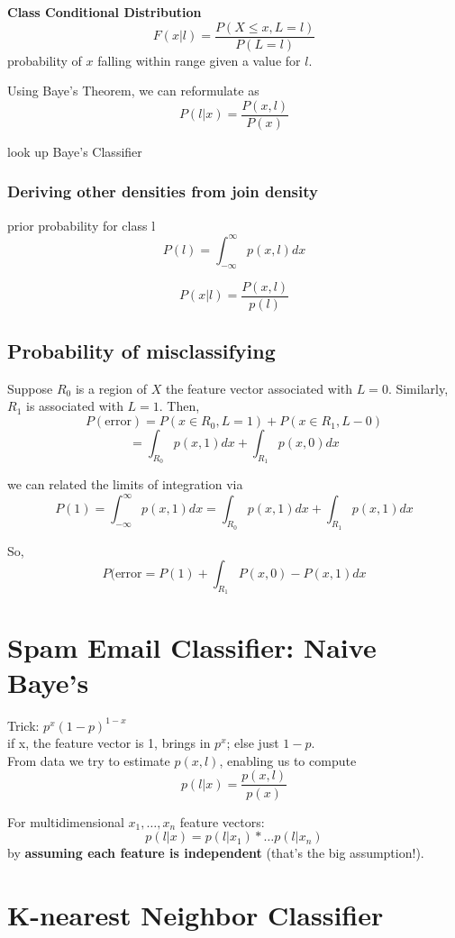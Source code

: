 \documentclass[12pt]{article}
\newcommand{\bt}[1]{\textbf{#1}} %
\begin{document}
\textbf{Class Conditional Distribution}\\
$$F(x | l) = \frac{P(X \leq x, L = l)}{P(L = l)}$$
probability of $x$ falling within range given a value for $l$.

Using Baye's Theorem, we can reformulate as
$$P(l | x) = \frac{P(x, l)}{P(x)}$$

look up Baye's Classifier

\subsubsection*{Deriving other densities from join density}
prior probability for class l
$$P(l) = \int_{-\infty}^\infty p(x, l) dx$$

$$P(x | l) = \frac{ P(x, l)}{p(l)}$$

\subsection*{Probability of misclassifying}

Suppose $R_0$ is a region of $X$ the feature vector associated with $L =0$. 
Similarly, $R_1$ is associated with $L=1$.
Then, 
$$P(\text{error}) = P(x \in R_0, L=1) + P(x \in R_1, L-0) $$
$$= \int_{R_0} p(x, 1) dx + \int_{R_1} p(x, 0) dx$$

we can related the limits of integration via 
$$P(1) = \int_{-\infty}^\infty p(x, 1) dx = \int_{R_0} p(x, 1) dx + \int_{R_1} p(x, 1) dx$$

So, 
$$P(\text{error} = P(1) + \int_{R_1} P(x, 0) - P(x, 1) dx$$




\section*{Spam Email Classifier: Naive Baye's}

Trick: $p^x ( 1 - p)^{1-x} $\\
if x, the feature vector is 1, brings in $p^x$; else just $1-p$.\\


From data we try to estimate $p(x, l)$, enabling us to compute
$$p(l | x) = \frac{p(x, l)}{p(x)}$$


For multidimensional $x_1, \dots, x_n$ feature vectors: 
$$p(l | x) = p(l | x_1) * \dots p(l | x_n)$$
by \bt{assuming each feature is independent} (that's the big assumption!).


\section*{K-nearest Neighbor Classifier}
\end{document}
